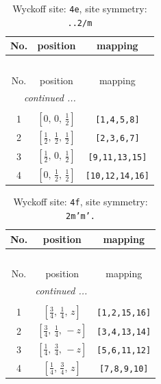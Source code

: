 \documentclass[fleqn,8pt]{jsarticle}
\begin{document}
\begin{longtable}{ccc}
\caption{Wyckoff site: {\tt 4e}, site symmetry: {\tt ..2/m}}
 \\
 \hline \hline
No. & position & mapping \\ \hline \endfirsthead

\multicolumn{2}{l}{\tablename\ \thetable{}} \\
 \hline \hline
No. & position & mapping \\ \hline \endhead

 \hline \hline
\multicolumn{2}{r}{\footnotesize\it continued ...} \\ \endfoot

 \hline \hline
\multicolumn{2}{r}{} \\ \endlastfoot

1 & $\left[ 0,\, 0,\, \frac{1}{2} \right]$ & {\tt [1,4,5,8]} \\ \hline
2 & $\left[ \frac{1}{2},\, \frac{1}{2},\, \frac{1}{2} \right]$ & {\tt [2,3,6,7]} \\ \hline
3 & $\left[ \frac{1}{2},\, 0,\, \frac{1}{2} \right]$ & {\tt [9,11,13,15]} \\ \hline
4 & $\left[ 0,\, \frac{1}{2},\, \frac{1}{2} \right]$ & {\tt [10,12,14,16]} \\
\end{longtable}
\renewcommand{\arraystretch}{1.2}
\begin{longtable}{ccc}
\caption{Wyckoff site: {\tt 4f}, site symmetry: {\tt 2m'm'.}}
 \\
 \hline \hline
No. & position & mapping \\ \hline \endfirsthead

\multicolumn{2}{l}{\tablename\ \thetable{}} \\
 \hline \hline
No. & position & mapping \\ \hline \endhead

 \hline \hline
\multicolumn{2}{r}{\footnotesize\it continued ...} \\ \endfoot

 \hline \hline
\multicolumn{2}{r}{} \\ \endlastfoot

1 & $\left[ \frac{3}{4},\, \frac{1}{4},\, z \right]$ & {\tt [1,2,15,16]} \\ \hline
2 & $\left[ \frac{3}{4},\, \frac{1}{4},\, - z \right]$ & {\tt [3,4,13,14]} \\ \hline
3 & $\left[ \frac{1}{4},\, \frac{3}{4},\, - z \right]$ & {\tt [5,6,11,12]} \\ \hline
4 & $\left[ \frac{1}{4},\, \frac{3}{4},\, z \right]$ & {\tt [7,8,9,10]} \\
\end{longtable}
\end{document}
